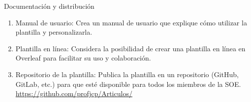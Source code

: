 \documentclass[10pt]{article}
\begin{document}
    Documentación y distribución
    \begin{enumerate}
        \item Manual de usuario: Crea un manual de usuario que explique cómo utilizar la plantilla y personalizarla.
        \item Plantilla en línea: Considera la posibilidad de crear una plantilla en línea en Overleaf para facilitar su uso y colaboración.
        \item Repositorio de la plantilla: Publica la plantilla en un repositorio (GitHub, GitLab, etc.) para que esté disponible para todos los miembros de la SOE. \url{https://github.com/profjcp/Articulos/}
    \end{enumerate}
    
    
\end{document}
